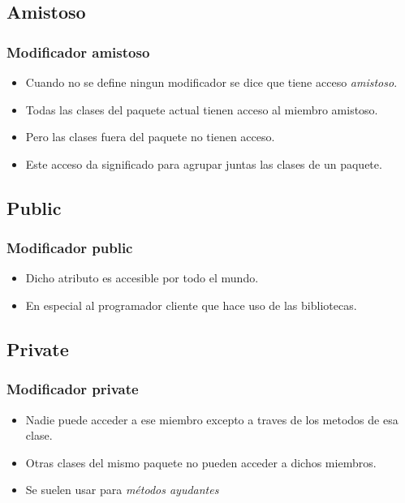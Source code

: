 \documentclass{beamer}
\begin{document}
\subsection{Amistoso}
\begin{frame}
\frametitle{Modificador amistoso}
\begin{itemize}[<+->]
\item Cuando no se define ningun modificador se dice que tiene acceso \emph{amistoso}.
\item Todas las clases del paquete actual tienen acceso al miembro amistoso. 
\item Pero las clases fuera del paquete no tienen acceso.
\item Este acceso da significado para agrupar juntas las clases de un paquete.
\end{itemize}
\pause
\end{frame}

\subsection{Public}
\begin{frame}
\frametitle{Modificador public}
\begin{itemize}[<+->]
\item Dicho atributo es accesible por todo el  mundo.
\item En especial al programador cliente que hace uso de las bibliotecas.
\end{itemize}
\pause
\end{frame}


\subsection{Private}
\begin{frame}
\frametitle{Modificador private}
\begin{itemize}[<+->]
\item Nadie puede acceder a ese miembro excepto a traves de los metodos de esa clase.
\item Otras clases del mismo paquete no pueden acceder a dichos miembros.
\item Se suelen usar para \emph{métodos ayudantes}
\end{itemize}
\pause
\end{frame}
\end{document}

